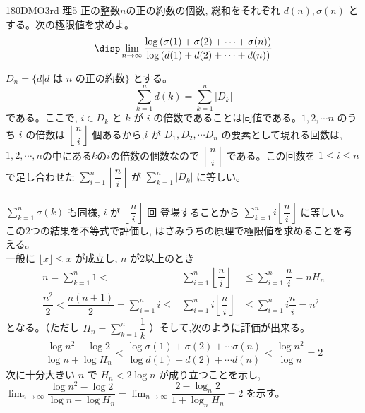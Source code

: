 \begin{prob}{180}{}{DMO3rd 理5}
 正の整数$n$の正の約数の個数, 総和をそれぞれ $d(n), \sigma (n)$ とする。次の極限値を求めよ。
 \[\disp\lim_{n\to \infty}\dfrac{\log{(\sigma(1) +\sigma(2) +\cdots +\sigma (n))}}{\log{(d(1)+d(2)+\cdots +d(n))}}\]
\end{prob}
$D_n=\{d| \mbox{$d$ は $n$ の正の約数}\}$ とする。
\[\displaystyle\sum_{k=1}^n d(k) = \displaystyle\sum_{k=1}^n|D_k|\] である。ここで, $i\in D_k$ と $k$ が $i$ の倍数であることは同値である。$1,2,\cdots n$ のうち $i$ の倍数は $\left\lfloor\dfrac{n}{i}\right\rfloor$ 個あるから,$i$ が $D_1, D_2, \cdots D_n$ の要素として現れる回数は, $1,2,\cdots, n$の中にある$k$の$i$の倍数の個数なので $\left\lfloor\dfrac{n}{i}\right\rfloor$ である。この回数を $1\le i\le n$ で足し合わせた $\displaystyle\sum_{i=1}^n \left\lfloor\dfrac{n}{i}\right\rfloor$ が $\displaystyle\sum_{k=1}^n |D_k|$ に等しい。 \\
\\
$\displaystyle\sum_{k=1}^n \sigma (k)$ も同様, $i$ が $\left\lfloor\dfrac{n}{i}\right\rfloor$ 回 登場することから $\displaystyle\sum_{k=1}^n i\left\lfloor\dfrac{n}{i}\right\rfloor$ に等しい。 \\
この2つの結果を不等式で評価し, はさみうちの原理で極限値を求めることを考える。\\
一般に $\lfloor x\rfloor\le x$ が成立し, $n$ が2以上のとき
\begin{eqnarray*}
n=\displaystyle\sum_{k=1}^n 1 < &\displaystyle\sum_{i=1}^n \left\lfloor\dfrac{n}{i}\right\rfloor& \le\displaystyle\sum_{i=1}^n \dfrac{n}{i}=nH_n\\
\dfrac{n^2}{2}<\dfrac{n(n+1)}{2}=
\displaystyle\sum_{i=1}^n i \le &\displaystyle\sum_{i=1}^n i\left\lfloor\dfrac{n}{i}\right\rfloor & \le \displaystyle\sum_{i=1}^n i\dfrac{n}{i} =n^2
\end{eqnarray*}
となる。（ただし $H_n=\displaystyle\sum_{k=1}^n\dfrac{1}{k}$ ）そして,次のように評価が出来る。
\begin{eqnarray*}
\dfrac{\log{n^2}-\log{2}}{\log{n}+\log{H_n}} < \dfrac{\log{\sigma(1) +\sigma (2)+\cdots \sigma (n)}}{\log{d(1)+d(2)+\cdots d(n)}} < \dfrac{\log{n^2}}{\log{n}} = 2
\end{eqnarray*}
次に十分大きい $n$ で $H_n<2\log{n}$ が成り立つことを示し,\\
$\displaystyle\lim_{n\to\infty}\dfrac{\log{n^2}-\log{2}}{\log{n}+\log{H_n}}=\displaystyle\lim_{n\to\infty}\dfrac{2-\log_n{2}}{1+\log_n{H_n}}=2$ を示す。\\
\\
